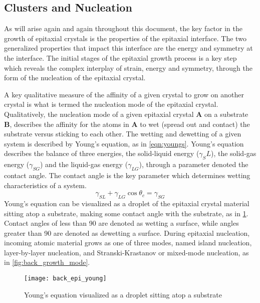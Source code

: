 \subsection{Clusters and Nucleation}
As will arise again and again throughout this document, the key factor in the growth of epitaxial crystals is the properties of the epitaxial interface. The two generalized properties that impact this interface are the energy and symmetry at the interface. The initial stages of the epitaxial growth process is a key step which reveals the complex interplay of strain, energy and symmetry, through the form of the nucleation of the epitaxial crystal.

A key qualitative measure of the affinity of a given crystal to grow on another crystal is what is termed the nucleation mode of the epitaxial crystal. Qualitatively, the nucleation mode of a given epitaxial crystal \textbf{A} on a substrate \textbf{B}, describes the affinity for the atoms in \textbf{A} to wet (spread out and contact) the substrate versus sticking to each other. The wetting and dewetting of a given system is described by Young's equation, as in \cref{eqn:youngs}. Young's equation describes the balance of three energies, the solid-liquid energy ($\gamma_SL$), the solid-gas energy ($\gamma_{SG}$) and the liquid-gas energy ($\gamma_{LG}$), through a parameter denoted the contact angle. The contact angle is the key parameter which determines wetting characteristics of a system.
\begin{equation}
\gamma_{SL} + \gamma_{LG} \cos{\theta_c} = \gamma_{SG} \label{eqn:youngs}
\end{equation}
Young's equation can be visualized as a droplet of the epitaxial crystal material sitting atop a substrate, making some contact angle with the substrate, as in \cref{fig:back_epi_young}. Contact angles of less than 90\degree{} are denoted as wetting a surface, while angles greater than 90\degree{} are denoted as dewetting a surface. During epitaxial nucleation, incoming atomic material grows as one of three modes, named island nucleation, layer-by-layer nucleation, and Stranski-Krastanov or mixed-mode nucleation, as in \cref{fig:back_growth_mode}. 
\begin{figure}
    \centering
    \texttt{[image: back\_epi\_young]}
    \caption[Young's equation]{\label{fig:back_epi_young}Young's equation visualized as a droplet sitting atop a substrate\cite{wikipedia_surface_energy}}
\end{figure}

